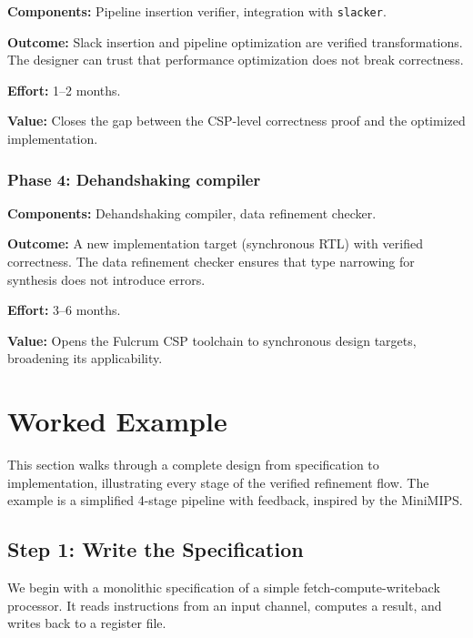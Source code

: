 \documentclass[11pt]{article}
\begin{document}
\textbf{Components:} Pipeline insertion verifier, integration with
\texttt{slacker}.

\textbf{Outcome:} Slack insertion and pipeline optimization are
verified transformations.  The designer can trust that performance
optimization does not break correctness.

\textbf{Effort:} 1--2 months.

\textbf{Value:} Closes the gap between the CSP-level correctness proof
and the optimized implementation.

\subsubsection{Phase 4: Dehandshaking compiler}

\textbf{Components:} Dehandshaking compiler, data refinement checker.

\textbf{Outcome:} A new implementation target (synchronous RTL) with
verified correctness.  The data refinement checker ensures that type
narrowing for synthesis does not introduce errors.

\textbf{Effort:} 3--6 months.

\textbf{Value:} Opens the Fulcrum CSP toolchain to synchronous design
targets, broadening its applicability.

\section{Worked Example}
\label{sec:example}

This section walks through a complete design from specification to
implementation, illustrating every stage of the verified refinement
flow.  The example is a simplified 4-stage pipeline with feedback,
inspired by the MiniMIPS.

\subsection{Step 1: Write the Specification}

We begin with a monolithic specification of a simple
fetch-compute-writeback processor.  It reads instructions from an
input channel, computes a result, and writes back to a register file.
\end{document}
